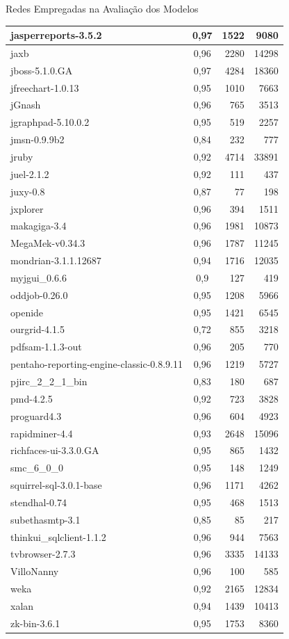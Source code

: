 \begin{chapter}{Redes Empregadas na Avaliação dos Modelos}
\begin{center}
\begin{longtable}{| p{10cm} | c | r | r |}
	jasperreports-3.5.2 & 0,97 & 1522 & 9080 \\ \hline
	jaxb & 0,96 & 2280 & 14298 \\ \hline
	jboss-5.1.0.GA & 0,97 & 4284 & 18360 \\ \hline
	jfreechart-1.0.13 & 0,95 & 1010 & 7663 \\ \hline
	jGnash & 0,96 & 765 & 3513 \\ \hline
	jgraphpad-5.10.0.2 & 0,95 & 519 & 2257 \\ \hline
	jmsn-0.9.9b2 & 0,84 & 232 & 777 \\ \hline
	jruby & 0,92 & 4714 & 33891 \\ \hline
	juel-2.1.2 & 0,92 & 111 & 437 \\ \hline
	juxy-0.8 & 0,87 & 77 & 198 \\ \hline
	jxplorer & 0,96 & 394 & 1511 \\ \hline
	makagiga-3.4 & 0,96 & 1981 & 10873 \\ \hline
	MegaMek-v0.34.3 & 0,96 & 1787 & 11245 \\ \hline
	mondrian-3.1.1.12687 & 0,94 & 1716 & 12035 \\ \hline
	myjgui\_0.6.6 & 0,9 & 127 & 419 \\ \hline
	oddjob-0.26.0 & 0,95 & 1208 & 5966 \\ \hline
	openide & 0,95 & 1421 & 6545 \\ \hline
	ourgrid-4.1.5 & 0,72 & 855 & 3218 \\ \hline
	pdfsam-1.1.3-out & 0,96 & 205 & 770 \\ \hline
	pentaho-reporting-engine-classic-0.8.9.11 & 0,96 & 1219 & 5727 \\ \hline
	pjirc\_2\_2\_1\_bin & 0,83 & 180 & 687 \\ \hline
	pmd-4.2.5 & 0,92 & 723 & 3828 \\ \hline
	proguard4.3 & 0,96 & 604 & 4923 \\ \hline
	rapidminer-4.4 & 0,93 & 2648 & 15096 \\ \hline
	richfaces-ui-3.3.0.GA & 0,95 & 865 & 1432 \\ \hline
	smc\_6\_0\_0 & 0,95 & 148 & 1249 \\ \hline
	squirrel-sql-3.0.1-base & 0,96 & 1171 & 4262 \\ \hline
	stendhal-0.74 & 0,95 & 468 & 1513 \\ \hline
	subethasmtp-3.1 & 0,85 & 85 & 217 \\ \hline
	thinkui\_sqlclient-1.1.2 & 0,96 & 944 & 7563 \\ \hline
	tvbrowser-2.7.3 & 0,96 & 3335 & 14133 \\ \hline
	VilloNanny & 0,96 & 100 & 585 \\ \hline
	weka & 0,92 & 2165 & 12834 \\ \hline
	xalan & 0,94 & 1439 & 10413 \\ \hline
	zk-bin-3.6.1 & 0,95 & 1753 & 8360 \\ \hline
	

\end{longtable}
\end{center}
\end{chapter}
